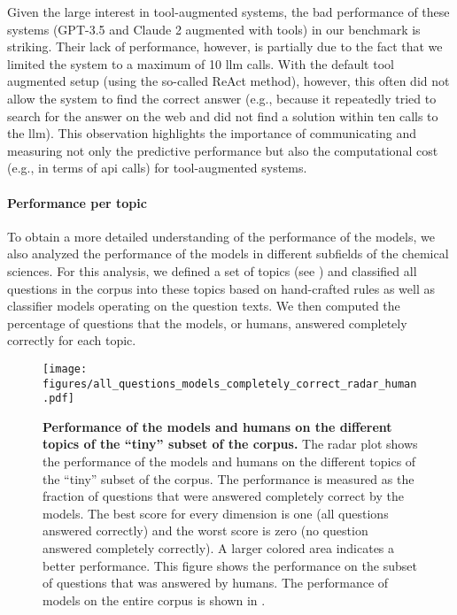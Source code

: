 \documentclass[11pt, oneside]{article}
\begin{document}
\begin{refsection}
Given the large interest in tool-augmented systems, the bad performance of these systems (GPT-3.5 and Claude 2 augmented with tools) in our benchmark is striking. 
Their lack of performance, however, is partially due to the fact that we limited the system to a maximum of 10 \gls{llm} calls.
With the default tool augmented setup (using the so-called ReAct method\autocite{yao2023react}), however, this often did not allow the system to find the correct answer (e.g., because it repeatedly tried to search for the answer on the web and did not find a solution within ten calls to the \gls{llm}).
This observation highlights the importance of communicating and measuring not only the predictive performance but also the computational cost (e.g., in terms of \gls{api} calls) for tool-augmented systems.

\paragraph{Performance per topic} To obtain a more detailed understanding of the performance of the models, we also analyzed the performance of the models in different subfields of the chemical sciences.
For this analysis, we defined a set of topics (see ) and classified all questions in the \chembench corpus into these topics based on hand-crafted rules as well as classifier models operating on the question texts.
We then computed the percentage of questions that the models, or humans, answered completely correctly for each topic.
\begin{figure}[!h]
    \centering
    \texttt{[image: figures/all\_questions\_models\_completely\_correct\_radar\_human.pdf]}
    \caption{\textbf{Performance of the models and humans on the different topics of the \enquote{tiny} subset of the \chembench corpus.} The radar plot shows the performance of the models and humans on the different topics of the \enquote{tiny} subset of the \chembench corpus. The performance is measured as the fraction of questions that were answered completely correct by the models.
    The best score for every dimension is one (all questions answered correctly) and the worst score is zero (no question answered completely correctly). A larger colored area indicates a better performance.
    This figure shows the performance on the subset of questions that was answered by humans. The performance of models on the entire corpus is shown in .
    }
    \label{fig:all_questions_models_completely_correct_radar_human}

\end{figure}
\end{refsection}
\end{document}
